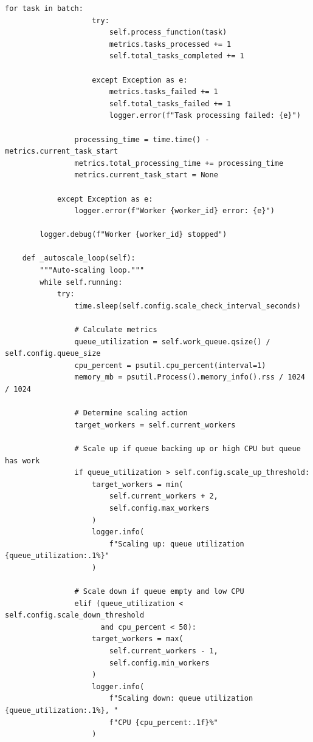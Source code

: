 \begin{lstlisting}[style=python, caption={Parallel Processor with Dynamic Allocation}]
                for task in batch:
                    try:
                        self.process_function(task)
                        metrics.tasks_processed += 1
                        self.total_tasks_completed += 1

                    except Exception as e:
                        metrics.tasks_failed += 1
                        self.total_tasks_failed += 1
                        logger.error(f"Task processing failed: {e}")

                processing_time = time.time() - metrics.current_task_start
                metrics.total_processing_time += processing_time
                metrics.current_task_start = None

            except Exception as e:
                logger.error(f"Worker {worker_id} error: {e}")

        logger.debug(f"Worker {worker_id} stopped")

    def _autoscale_loop(self):
        """Auto-scaling loop."""
        while self.running:
            try:
                time.sleep(self.config.scale_check_interval_seconds)

                # Calculate metrics
                queue_utilization = self.work_queue.qsize() / self.config.queue_size
                cpu_percent = psutil.cpu_percent(interval=1)
                memory_mb = psutil.Process().memory_info().rss / 1024 / 1024

                # Determine scaling action
                target_workers = self.current_workers

                # Scale up if queue backing up or high CPU but queue has work
                if queue_utilization > self.config.scale_up_threshold:
                    target_workers = min(
                        self.current_workers + 2,
                        self.config.max_workers
                    )
                    logger.info(
                        f"Scaling up: queue utilization {queue_utilization:.1%}"
                    )

                # Scale down if queue empty and low CPU
                elif (queue_utilization < self.config.scale_down_threshold
                      and cpu_percent < 50):
                    target_workers = max(
                        self.current_workers - 1,
                        self.config.min_workers
                    )
                    logger.info(
                        f"Scaling down: queue utilization {queue_utilization:.1%}, "
                        f"CPU {cpu_percent:.1f}%"
                    )


\end{lstlisting}
